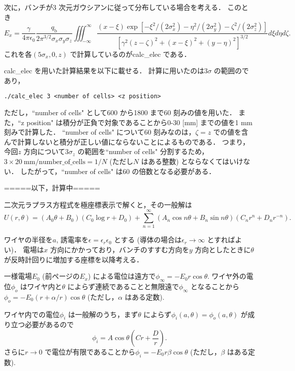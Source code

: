 \documentclass{jsarticle}
\begin{document}
次に，バンチが3 次元ガウシアンに従って分布している場合を考える．
このとき
\begin{equation}
E_x = \frac{\gamma}{4\pi\epsilon_0}\frac{q_\mathrm{b}}{2\pi^{3/2}\sigma_x\sigma_y\sigma_z}\iiint_{-\infty}^\infty\frac{(x - \xi)\exp[-\xi^2/(2\sigma_x^2)-\eta^2/(2\sigma_y^2)-\zeta^2/(2\sigma_z^2)]}{[\gamma^2(z-\zeta)^2 + (x - \xi)^2 + (y - \eta)^2]^{3/2}}d\xi d\eta d\zeta.
\end{equation}
これを各$(5\sigma_x, 0, z)$ で計算しているのがcalc\_elec である．

\newpage

calc\_elec を用いた計算結果を以下に載せる．
計算に用いたのは$3 \sigma$ の範囲のであり，
\begin{lstlisting}
./calc_elec 3 <number of cells> <z position>
\end{lstlisting}
ただし，``number of cells" として600 から1800 まで60 刻みの値を用いた．
また，``z position" は積分が正負で対象であることから0-30 [mm] までの値を1 mm 刻みで計算した．
``number of cells" について60 刻みなのは，$\zeta = z$ での値を含んで計算しないと積分が正しい値にならないことによるものである．
つまり，今回$z$ 方向について$3\sigma_z$ の範囲を``number of cells" 分割するため，$3 \times 20~\mathrm{mm} / \mathrm{number\_of\_cells} = 1/N$ (ただし$N$ はある整数) とならなくてはいけない．
したがって，``number of cells" は60 の倍数となる必要がある．
\begin{center}
=====以下，計算中=====
\end{center}

\newpage

二次元ラプラス方程式を極座標表示で解くと，その一般解は
\begin{equation}
U(r, \theta) = (A_0\theta + B_0)(C_0\log r + D_0)  + \sum_{n = 1}^\infty (A_n\cos n\theta + B_n\sin n\theta)(C_n r^n + D_n r^{-n}).
\end{equation}

ワイヤの半径を$a$, 誘電率を$\epsilon = \epsilon_r \epsilon_0$ とする (導体の場合は$\epsilon_r\to\infty$ とすればよい)．
電場は$x$ 方向にかかっており，バンチのすすむ方向を$y$ 方向としたときに$\theta$ が反時計回りに増加する座標を以降考える．

一様電場$E_0$ (前ページの$E_x$) による電位は遠方で$\phi_\infty = -E_0r\cos\theta$.
ワイヤ外の電位$\phi_o$ はワイヤ内と$\theta$ によらず連続であることと無限遠で$\phi_\infty$ となることから$\phi_o = -E_0(r + \alpha/r)\cos\theta$ (ただし，$\alpha$ はある定数).

ワイヤ内での電位$\phi_i$ は一般解のうち，まず$\theta$ によらず$\phi_i(a,\theta) = \phi_o(a,\theta)$ が成り立つ必要があるので
\begin{equation}
\phi_i = A\cos\theta (Cr + \frac{D}{r}).
\end{equation}
さらに$r\to 0$ で電位が有限であることから$\phi_i = -E_0r\beta\cos\theta$ (ただし，$\beta$ はある定数).
\end{document}
